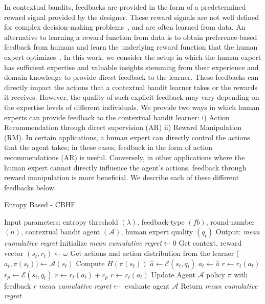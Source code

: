In contextual bandits, feedbacks are provided in the form of a predetermined reward signal provided by the designer. These reward signals are not well defined for complex decision-making problems~\citep{blanchard2023adversarial,dragone2019deriving}, and are often learned from data.  An alternative to learning a reward function from data is to obtain preference-based feedback from humans and learn the underlying reward function that the human expert optimizes~\citep{sekhari2024contextual}. In this work, we consider the setup in which the human expert has sufficient expertise and valuable insights stemming from their experience and domain knowledge to provide direct feedback to the learner. These feedbacks can directly impact the actions that a contextual bandit learner takes or the rewards it receives. However, the quality of such explicit feedback may vary depending on the expertise levels of different individuals.
 We provide two ways in which human experts can provide feedback to the contextual bandit learner: i) Action Recommendation through direct supervision (AR) ii) Reward Manipulation (RM). In certain applications, a human expert can directly control the actions that the agent takes; in these cases, feedback in the form of action recommendations (AR) is useful. Conversely, in other applications where the human expert cannot directly influence the agent's actions, feedback through reward manipulation is more beneficial. We describe each of these different feedbacks below. 
 \begin{algorithm}
\caption{Enropy Based - CBHF}
\label{alg:example}
\begin{algorithmic}[1]
\REQUIRE Input parameters: entropy threshold $(\lambda)$, feedback-type $(fb)$, round-number $(n)$, contextual bandit agent $(\mathcal{A})$, human expert quality $(q_t)$
\ENSURE Output: \emph{mean cumulative regret}
\STATE Initialize \emph{mean cumulative regret}$\gets 0$
    \STATE Get context, reward vector $(s_t,r_t)\gets\omega$
    \STATE Get actions and action distribution from the learner ($a_t,\pi(s_t)) \gets \mathcal{A}(s_t)$
    \STATE Compute $H(\pi(s_t))$
    \STATE $\hat a\gets\mathcal{E}(s_t,q_t)$
    \STATE $a_t\gets \hat a$
    \STATE $r\gets r_t(a_t)$
    \STATE $r_p \gets\mathcal E(s_t,q_t)$
    \STATE $r\gets r_t(a_t)+r_p$
    \ENDIF
    \ELSE
    \STATE $r\gets r_t(a_t)$
    \ENDIF
    \STATE Update Agent $\mathcal A$ policy $\pi$ with feedback $r$
    \STATE \emph{mean cumulative regret}$\gets$ evaluate agent $\mathcal A$
\ENDFOR
\STATE Return \emph{mean cumulative regret}
\end{algorithmic}
\end{algorithm}

